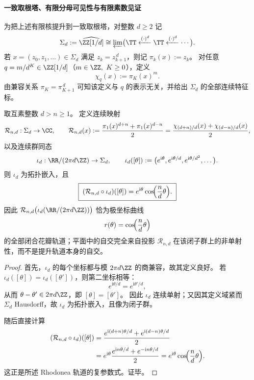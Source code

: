 \paragraph{一致取根塔、有限分母可见性与有限素数见证}
为把上述有限核提升到一致取根塔，对整数 \(d\ge 2\) 记
\[
\Sigma_d:=\widehat{\ZZ[1/d]}
\cong
\varprojlim\bigl(\TT\xleftarrow{(\cdot)^d}\TT\xleftarrow{(\cdot)^d}\cdots\bigr).
\]
若 \(x=(z_0,z_1,\dots)\in \Sigma_d\) 满足 \(z_k=z_{k+1}^{\,d}\)，则记 \(\pi_k(x):=z_k\)。
对任意 \(q=m/d^K\in \ZZ[1/d]\)（\(m\in\ZZ,\ K\ge 0\)），定义
\[
\chi_q(x):=\pi_K(x)^m.
\]
由兼容关系 \(\pi_K=\pi_{K+1}^{\,d}\) 可知该定义与 \(q\) 的表示无关，并给出 \(\Sigma_d\) 的全部连续特征标。

\begin{theorem}\label{thm:cdim-rhodonea-solenoid-desingularized-lift}
取互素整数 \(d>n\ge 1\)。
定义连续映射
\[
\mathcal R_{n,d}:\Sigma_d\to\CC,
\qquad
\mathcal R_{n,d}(x):=\frac{\pi_1(x)^{d+n}+\pi_1(x)^{d-n}}{2}
=\frac{\chi_{(d+n)/d}(x)+\chi_{(d-n)/d}(x)}{2},
\]
以及连续群同态
\[
\iota_d:\RR/(2\pi d\ZZ)\to \Sigma_d,
\qquad
\iota_d([\theta]):=\bigl(e^{\mathrm{i}\theta},e^{\mathrm{i}\theta/d},e^{\mathrm{i}\theta/d^2},\dots\bigr).
\]
则 \(\iota_d\) 为拓扑嵌入，且
\[
\boxed{\;
(\mathcal R_{n,d}\circ \iota_d)([\theta])
=
e^{\mathrm{i}\theta}\cos\!\Bigl(\frac{n}{d}\theta\Bigr).\;}
\]
因此 \(\mathcal R_{n,d}\bigl(\iota_d(\RR/(2\pi d\ZZ))\bigr)\) 恰为极坐标曲线
\[
r(\theta)=\cos\!\Bigl(\frac{n}{d}\theta\Bigr)
\]
的全部闭合花瓣轨道；平面中的自交完全来自投影 \(\mathcal R_{n,d}\) 在该闭子群上的非单射性，而不是提升轨道本身的自交。
\end{theorem}
\begin{proof}
首先，\(\iota_d\) 的每个坐标都与模 \(2\pi d\ZZ\) 的商兼容，故其定义良好。
若 \(\iota_d([\theta])=\iota_d([\theta'])\)，则第二坐标相等：
\[
e^{\mathrm{i}\theta/d}=e^{\mathrm{i}\theta'/d},
\]
从而 \(\theta-\theta'\in 2\pi d\ZZ\)，即 \([\theta]=[\theta']\)。
因此 \(\iota_d\) 连续单射；又因其定义域紧而 \(\Sigma_d\) Hausdorff，故 \(\iota_d\) 为拓扑嵌入，且像为闭子群。

随后直接计算
\[
\begin{aligned}
(\mathcal R_{n,d}\circ \iota_d)([\theta])
&=
\frac{e^{\mathrm{i}(d+n)\theta/d}+e^{\mathrm{i}(d-n)\theta/d}}{2} \\
&=
e^{\mathrm{i}\theta}\frac{e^{\mathrm{i}n\theta/d}+e^{-\mathrm{i}n\theta/d}}{2}
=
e^{\mathrm{i}\theta}\cos\!\Bigl(\frac{n}{d}\theta\Bigr).
\end{aligned}
\]
这正是所述 Rhodonea 轨道的复参数式。证毕。
\end{proof}

